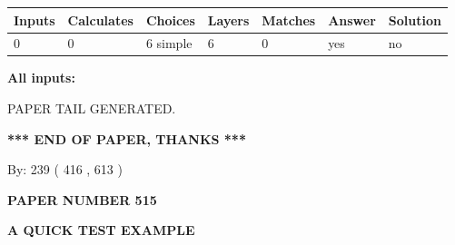 \documentclass[12pt]{article}
\begin{document}
 
\noindent{}
 
 
   
   
   
   
\noindent\begin{tabular}{|l|l|l|l|l|l|l|}
 \hline
Inputs & Calculates & Choices & Layers & Matches & Answer & Solution \\ \hline
 0  & 
 0  & 
 6
  simple  
  & 
 6  & 
 0  & 
  yes & 
  no 
  \\ \hline
 \end{tabular}
   
   
   
   
\noindent{}
   
   
   
   
\noindent\vspace{0.1in}\hspace{-0.08in} {\textbf{\Large{All inputs: }}}
   
   
   
   
   
   
 \vspace{0.2in}
 
   
   
\vspace{2.0in} PAPER TAIL GENERATED.
   
   
   
   
\vspace{1.0in} 
{\textbf{\large{ *** END OF PAPER, THANKS *** }}} 
   
   
\hspace{1.0in} By: 
 239 ( 416 ,  613 )
   
   
   
   
\newpage 
\setcounter{page}{ 
   515001 } 
   
   
   
   
 {\textbf{ \Large{ PAPER NUMBER  515  }}}
   
   
\vspace{0.2in}
   
   
   
   
   
   
   
   
 \vspace{0.2in}
{\LARGE {\textbf{ A QUICK TEST EXAMPLE}}}
   
\end{document}
